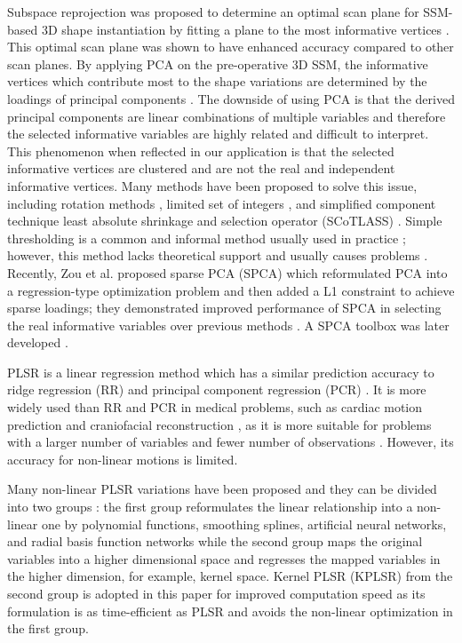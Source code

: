 \documentclass[review]{elsarticle}
\begin{document}
Subspace reprojection was proposed to determine an optimal scan plane for SSM-based 3D shape instantiation by fitting a plane to the most informative vertices \citep{lee2005assessment}. This optimal scan plane was shown to have enhanced accuracy compared to other scan planes\citep{lee2005assessment}. By applying PCA \citep{jolliffe2002principal} on the pre-operative 3D SSM, the informative vertices which contribute most to the shape variations are determined by the loadings of principal components \citep{lee2010dynamic}. The downside of using PCA is that the derived principal components are linear combinations of multiple variables and therefore the selected informative variables are highly related and difficult to interpret. This phenomenon when reflected in our application is that the selected informative vertices are clustered and are not the real and independent informative vertices. Many methods have been proposed to solve this issue, including rotation methods \citep{jolliffe1995rotation}, limited set of integers \citep{vines2000simple}, and simplified component technique least absolute shrinkage and selection operator (SCoTLASS) \citep{jolliffe2003modified}. Simple thresholding is a common and informal method usually used in practice \citep{lee2010dynamic}; however, this method lacks theoretical support and usually causes problems \citep{cadima1995loading}. Recently, Zou et al. proposed sparse PCA (SPCA) which reformulated PCA into a regression-type optimization problem and then added a L1 constraint to achieve sparse loadings; they demonstrated improved performance of SPCA in selecting the real informative variables over previous methods \citep{zou2006sparse}. A SPCA toolbox was later developed \citep{sjostrand2012spasm}.

PLSR is a linear regression method which has a similar prediction accuracy to ridge regression (RR) and principal component regression (PCR) \citep{frank1993statistical}. It is more widely used than RR and PCR in medical problems, such as cardiac motion prediction \citep{ablitt2004predictive} and craniofacial reconstruction \citep{duan20153d}, as it is more suitable for problems with a larger number of variables and fewer number of observations \citep{rosipal2001kernel}. However, its accuracy for non-linear motions is limited.

Many non-linear PLSR variations have been proposed and they can be divided into two groups \citep{rosipal2006overview}: the first group reformulates the linear relationship into a non-linear one by polynomial functions, smoothing splines, artificial neural networks, and radial basis function networks while the second group maps the original variables into a higher dimensional space and regresses the mapped variables in the higher dimension, for example, kernel space. Kernel PLSR (KPLSR)  \citep{rosipal2001kernel} from the second group is adopted in this paper for improved computation speed as its formulation is as time-efficient as PLSR and avoids the non-linear optimization in the first group.
\end{document}
